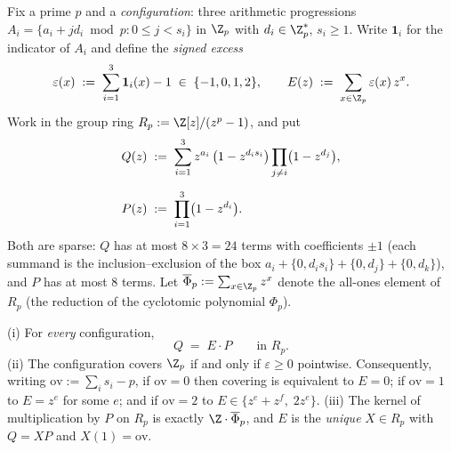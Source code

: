 Fix a prime $p$ and a \emph{configuration}: three arithmetic progressions
$A_i=\{a_i+jd_i \bmod p:0\le j<s_i\}$ in $\Z_p$ with $d_i\in\Z_p^{*}$,
$s_i\ge 1$. Write $\mathbf 1_i$ for the indicator of $A_i$ and define the
\emph{signed excess}
\[
\varepsilon(x)\;:=\;\sum_{i=1}^{3}\mathbf 1_i(x)-1\;\in\;\{-1,0,1,2\},
\qquad
E(z)\;:=\;\sum_{x\in\Z_p}\varepsilon(x)\,z^x .
\]
Work in the group ring $R_p:=\Z[z]/(z^p-1)$, and put
\begin{align*}
Q(z)\;&:=\;\sum_{i=1}^{3} z^{a_i}\,\bigl(1-z^{d_i s_i}\bigr)
        \prod_{j\ne i}\bigl(1-z^{d_j}\bigr),\\[\medskipamount]
P(z)\;&:=\;\prod_{i=1}^{3}\bigl(1-z^{d_i}\bigr).
\end{align*}
Both are sparse: $Q$ has at most $8\times 3=24$ terms with coefficients
$\pm1$ (each summand is the inclusion--exclusion of the box
$a_i+\{0,d_is_i\}+\{0,d_j\}+\{0,d_k\}$), and $P$ has at most $8$ terms. Let
$\overline\Phi_p:=\sum_{x\in\Z_p}z^x$ denote the all-ones element of $R_p$
(the reduction of the cyclotomic polynomial $\Phi_p$).

\begin{theorem}\label{thm:GT}
\;\textup{(i)} For \emph{every} configuration,
\[
Q \;=\; E\cdot P \qquad\text{in } R_p .
\]
\textup{(ii)} The configuration covers $\Z_p$ if and only if
$\varepsilon\ge 0$ pointwise. Consequently, writing
$\mathrm{ov}:=\sum_i s_i-p$, if $\mathrm{ov}=0$ then covering is equivalent
to $E=0$; if $\mathrm{ov}=1$ to $E=z^e$ for some $e$; and if
$\mathrm{ov}=2$ to $E\in\{z^e+z^f,\;2z^e\}$.
\textup{(iii)} The kernel of multiplication by $P$ on $R_p$ is exactly
$\Z\cdot\overline\Phi_p$, and $E$ is the \emph{unique} $X\in R_p$ with
$Q=XP$ and $X(1)=\mathrm{ov}$.
\end{theorem}

